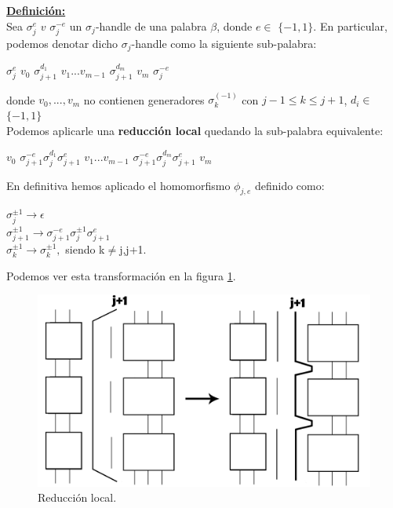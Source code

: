 \underline{\textbf{ Definición:}}\\
Sea $\sigma_{j}^{e}$ $v$ $\sigma_{j}^{-e} $ un $\sigma_{j}$-handle de una palabra $\beta$, donde $e \in$ $ \{-1,1\} $. En particular, podemos denotar dicho $\sigma_{j}$-handle como la siguiente sub-palabra:
\begin{center}
	$ \sigma_{j}^{e} $ $ v_{0} $ $\sigma_{j+1}^{d_{1}} $ $ v_{1}...v_{m-1} $ $\sigma_{j+1}^{d_{m}} $ $ v_{m} $ $ \sigma_{j}^{-e} $
\end{center} donde $v_{0},...,v_{m}$ no contienen generadores $\sigma_{k}^{(-1)}$ con $ j-1 \le k \le j+1 $, $d_{i} \in$ $ \{-1,1\} $\\
Podemos aplicarle una \textbf{reducción local} quedando la sub-palabra equivalente:
\begin{center}
 $ v_{0} $ $\sigma_{j+1}^{-e} \sigma_{j}^{d_{1}} \sigma_{j+1}^{e}$ $ v_{1}...v_{m-1} $ $\sigma_{j+1}^{-e} \sigma_{j}^{d_{m}} \sigma_{j+1}^{e}$ $ v_{m} $
\end{center}
En definitiva hemos aplicado el homomorfismo $\phi_{j,e}$ definido como:
\begin{center}
	$\sigma_{j}^{\pm 1} \rightarrow \epsilon$\\
	$\sigma_{j+1}^{\pm 1} \rightarrow \sigma_{j+1}^{-e} \sigma_{j}^{\pm 1} \sigma_{j+1}^{e}$\\
	$\sigma_{k}^{\pm 1} \rightarrow \sigma_{k}^{\pm 1},$ siendo k$ \neq $j,j+1.\\
\end{center}

Podemos ver esta transformación en la figura \ref{h3}.\\
\begin{figure}[h!]
	\centering
	\includegraphics[width=14cm]{itrenzas/h14.png}
	\caption{Reducción local.}
	\label{h3} 
\end{figure}

